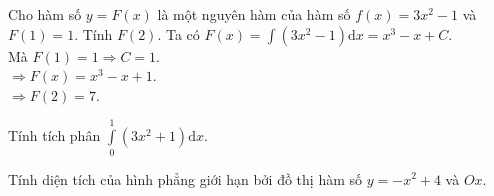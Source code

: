 \begin{bt}%

	Cho hàm số $y=F(x)$ là một nguyên hàm của hàm số $f(x) = 3x^2-1$ và $F(1) = 1$. Tính $F(2)$.
	\loigiai
	{
		Ta có $F(x) = \displaystyle \int  \left(3x^2-1\right) \mathrm{d}x = x^3 - x + C$.\\
		Mà $F(1) = 1 \Rightarrow C = 1$.\\
		$\Rightarrow F(x) = x^3 - x + 1$.\\
		$\Rightarrow F(2) = 7$.
	}
\end{bt}

\begin{bt}%

	Tính tích phân $\displaystyle\int\limits_{0}^{1} \left(3x^2 + 1\right) \mathrm{d}x$.
\end{bt}

\begin{bt}%

	Tính diện tích của hình phẳng giới hạn bởi đồ thị hàm số $y=-x^2+4$ và $Ox$. 
\end{bt}

